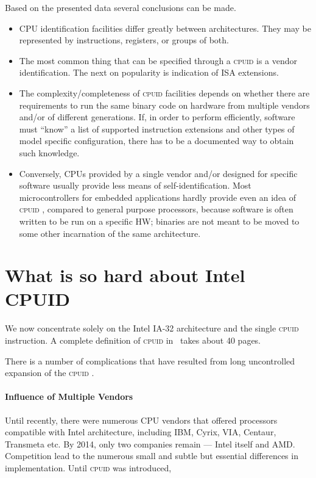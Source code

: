 \documentclass[a4paper,10pt,oneside,unicode]{article}
\newcommand{\cpuid}{\textsc{cpuid} }
\begin{document}
Based on the presented data several conclusions can be made.
\begin{itemize}
    \item {CPU} identification facilities differ greatly between architectures. They may be represented by instructions, registers, or groups of both.
    \item The most common thing that can be specified through a \cpuid is a vendor identification. The next on popularity is indication of ISA extensions.
    
    \item The complexity/completeness of \cpuid facilities depends on whether there are requirements to run the same binary code on hardware from multiple vendors and/or of different generations. If, in order to perform efficiently, software must “know” a list of supported instruction extensions and other types of model specific configuration, there has to be a documented way to obtain such knowledge.
    \item Conversely, {CPUs} provided by a single vendor and/or designed for specific software usually provide less means of self-identification. Most microcontrollers for embedded applications hardly provide even an idea of \cpuid, compared to general purpose processors, because software is often written to be run on a specific HW; binaries are not meant to be moved to some other incarnation of the same architecture.
    
\end{itemize}

\section{What is so hard about Intel CPUID}

We now concentrate solely on the Intel IA-32 architecture and the single \cpuid instruction. A complete definition of \cpuid in~\cite{intelmanual-7vols} takes about 40 pages.

There is a number of complications that have resulted from long uncontrolled expansion of the \cpuid.

\paragraph{Influence of Multiple Vendors} Until recently, there were numerous {CPU} vendors that offered processors compatible with Intel architecture, including IBM, Cyrix, VIA, Centaur, Transmeta etc. By 2014, only two companies remain --- Intel itself and AMD. Competition lead to the numerous small and subtle but essential differences in implementation. Until \cpuid was introduced, 
\end{document}

